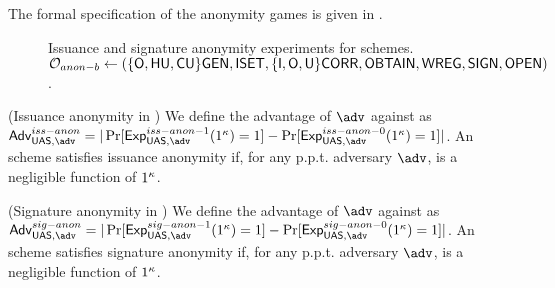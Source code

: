 The formal specification of the anonymity games is given in
.

\begin{figure*}[htp!]
  \centering
  \caption{Issuance and signature anonymity experiments for \UAS schemes.
    $\mathcal{O}_{anon-b} \gets (\lbrace\mathsf{O},\mathsf{HU},\mathsf{CU}\rbrace\mathsf{GEN},\mathsf{ISET},\lbrace\mathsf{I},
    \mathsf{O},\mathsf{U}\rbrace\mathsf{CORR},\mathsf{OBTAIN},\mathsf{WREG},\mathsf{SIGN},\mathsf{OPEN})$.}
  \label{fig:exp-uas-anonb}
\end{figure*}

\begin{definition}{(Issuance anonymity in \UAS)}
  \label{def:issue-anonymity-uas}  
  We define the advantage \AdvIssAnon of $\adv$ against \ExpIssAnonb as
  $\AdvIssAnon=|\Pr\lbrack\ExpIssAnono(1^\secpar)=1\rbrack-
  \Pr\lbrack\ExpIssAnonz(1^\secpar)=1\rbrack|$.
  An \UAS scheme satisfies issuance anonymity if, for any p.p.t. adversary
  $\adv$, \AdvIssAnon is a negligible function of $1^\kappa$.
\end{definition}

\begin{definition}{(Signature anonymity in \UAS)}
  \label{def:sign-anonymity-uas}  
  We define the advantage \AdvSigAnon of $\adv$ against \ExpSigAnonb as
  $\AdvSigAnon=|\Pr\lbrack\ExpSigAnono(1^\secpar)=1\rbrack-
  \Pr\lbrack\ExpSigAnonz(1^\secpar)=1\rbrack|$.
  An \UAS scheme satisfies signature anonymity if, for any p.p.t. adversary
  $\adv$, \AdvSigAnon is a negligible function of $1^\kappa$.
\end{definition}

